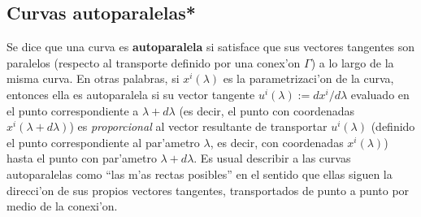 \subsection{Curvas autoparalelas*}
Se dice que una curva es \textbf{autoparalela} si satisface que sus vectores tangentes son paralelos (respecto al transporte definido por una conex'on $\Gamma$) a lo largo de la misma curva. En otras palabras, si $x^i(\lambda)$ es la parametrizaci'on de la curva, entonces ella es autoparalela si su vector tangente $u^i(\lambda):=dx^i/d\lambda$ evaluado en el punto correspondiente a $\lambda+d\lambda$ (es decir, el punto con coordenadas $x^i(\lambda+d\lambda)$) es \textit{proporcional} al vector resultante de transportar $u^i(\lambda)$ (definido el punto correspondiente al par'ametro $\lambda$, es decir, con coordenadas $x^i(\lambda)$) hasta el punto con par'ametro $\lambda+d\lambda$. Es usual describir a las curvas autoparalelas como ``las m'as rectas posibles'' en el sentido que ellas siguen la direcci'on de sus propios vectores tangentes, transportados de punto a punto por medio de la conexi'on.


